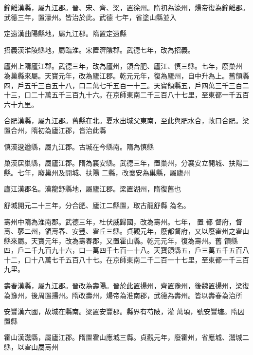 \begin{pinyinscope}
 鐘離漢縣，屬九江郡。晉、宋、齊、梁，置徐州。隋初為濠州，煬帝復為鐘離郡。武德三年，置濠州。皆治於此。武德
 七年，省塗山縣並入



 定遠漢曲陽縣地，屬九江郡。隋置定遠縣



 招義漢淮陵縣地，屬臨淮。宋置濟陰郡。武德七年，改為招義。



 廬州上隋廬江郡。武德三年，改為廬州，領合肥、廬江、慎三縣。七年，廢巢州
 為巢縣來屬。天寶元年，改為廬江郡。乾元元年，復為廬州，自中升為上。舊領縣四，戶五千三百五十八，口二萬七千五百一十三。天寶領縣五，戶四萬三千三百二十三，口二十萬五千三百九十六。在京師東南二千三百八十七里，至東都一千五百六十九里。



 合肥漢縣，屬九江郡。舊縣在北。夏水出城父東南，至此與肥水合，故曰合肥。梁置合州，隋初為廬江郡，皆治此縣



 慎漢逡遒縣，屬九江郡。古城在今縣南。隋為慎縣



 巢漢居巢縣，屬廬江郡。隋為襄安縣。武德三年，置巢州，分襄安立開城、扶陽二縣。七年，廢巢州及開城、扶陽
 二縣，改襄安為巢縣，屬廬州



 廬江漢郡名。漢龍舒縣地，屬廬江郡。梁置湖州，隋復舊也



 舒城開元二十三年，分合肥、廬江二縣置，取古龍舒縣
 為名。



 壽州中隋為淮南郡。武德三年，杜伏威歸國，改為壽州。七年，
 置
 都
 督府，督壽、蓼二州，領壽春、安豐、霍丘三縣。貞觀元年，廢都督府，又以廢霍州之霍山縣來屬。天寶元年，改為壽春郡，又置霍山縣。乾元元年，復為壽州。舊
 領縣四，戶二千九百九十六，口一萬四千七百一十八。天寶領縣五，戶三萬五千五百八十二，口十八萬七千五百八十七。在京師東南二千二百一十七里，至東都一千三百九里。



 壽春漢縣，屬九江郡。晉改為壽陽。晉於此置揚州，齊置豫州，後魏置揚州，梁復為豫州，後周置揚州。隋改壽州，煬帝為淮南郡，武德為壽州。皆以壽春為治所



 安豐漢六國，故城在縣南。梁置安豐郡。縣界有芍陂，灌
 萬頃，號安豐塘。隋因置縣



 霍山漢灊縣，屬廬江郡。隋置霍山應城三縣。貞觀元年，廢霍州，省應城、灊城二縣，以霍山屬壽州




\end{pinyinscope}
